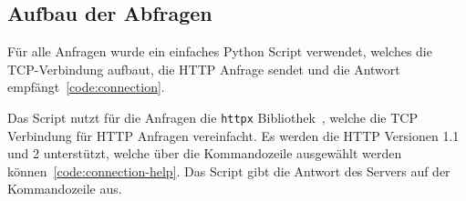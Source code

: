 \FloatBarrier
\subsection{Aufbau der Abfragen}

Für alle Anfragen wurde ein einfaches Python Script verwendet, welches die TCP-Verbindung aufbaut, die HTTP Anfrage sendet und die Antwort empfängt~\ref{code:connection}.


Das Script nutzt für die Anfragen die \texttt{httpx} Bibliothek~\cite{httpx_http2}, welche die TCP Verbindung für HTTP Anfragen vereinfacht.
Es werden die HTTP Versionen 1.1 und 2 unterstützt, welche über die Kommandozeile ausgewählt werden können~\ref{code:connection-help}.
Das Script gibt die Antwort des Servers auf der Kommandozeile aus.

